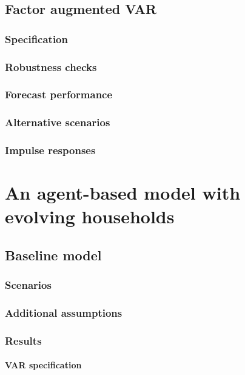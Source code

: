         \section{Factor augmented VAR}
            \lipsum[1]
            \subsection{Specification}
                \lipsum[1]
            \subsection{Robustness checks}
                \lipsum[1]
            \subsection{Forecast performance}
                \lipsum[1]
            \subsection{Alternative scenarios}
                \lipsum[1]
            \subsection{Impulse responses}
                \lipsum[1]
    \chapter{An agent-based model with evolving households}
        \lipsum[1]
        \section{Baseline model}
            \lipsum[1]
            \subsection{Scenarios}
                \lipsum[1]
            \subsection{Additional assumptions}
                \lipsum[1]
            \subsection{Results}
                \lipsum[1]
                \subsubsection{VAR specification}
                    \lipsum[1]
